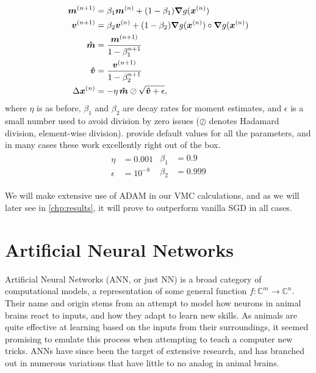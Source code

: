 \documentclass[Thesis.tex]{subfiles}
\begin{document}
\begin{align}
  \bm{m}^{(n+1)} &= \beta_1 \bm{m}^{(n)} + (1 - \beta_1)\grad{g(\bm{x}^{(n)})}\\
  \bm{v}^{(n+1)} &= \beta_2 \bm{v}^{(n)} + (1 - \beta_2)\grad{g(\bm{x}^{(n)})}\circ\grad{g(\bm{x}^{(n)})}\\
  \bm{\hat m} &= \frac{\bm{m}^{(n+1)}}{1 - \beta_1^{n+1}}\\
  \bm{\hat v} &= \frac{\bm{v}^{(n+1)}}{1 - \beta_2^{n+1}}\\
  \Delta \bm{x}^{(n)}&= -\eta\, \bm{\hat m}\oslash\sqrt{\bm{\hat v} + \epsilon},
\end{align}
where $\eta$ is as before, $\beta_1$ and $\beta_2$ are decay rates for moment
estimates, and $\epsilon$ is a small number used to avoid division by zero
issues ($\oslash$ denotes Hadamard division, element-wise division). \textcite{KingmaB14} provide default values for all the parameters, and
in many cases these work excellently right out of the box.
\begin{align}
  \label{eq:adam-default-parameters}
  \begin{split}
    \eta &= 0.001\\
    \epsilon &= 10^{-8}
  \end{split}
  \begin{split}
    \beta_1 &= 0.9\\
    \beta_2 &= 0.999
  \end{split}
\end{align}

We will make extensive use of ADAM in our VMC calculations, and as we will later
see in \cref{chp:results}, it will prove to outperform vanilla SGD in all cases.


\section{Artificial Neural Networks}

Artificial Neural Networks (ANN, or just NN) is a broad category of
computational models, a representation of some general function $f:
\mathbb{C}^m\to\mathbb{C}^n$. Their name and origin stems from an attempt to
model how neurons in animal brains react to inputs, and how they adapt to learn
new skills. As animals are quite effective at learning based on the inputs from
their surroundings, it seemed promising to emulate this
process when attempting to teach a computer new tricks. ANNs have since been the
target of extensive research, and has branched out in numerous variations that
have little to no analog in animal brains.
\end{document}
